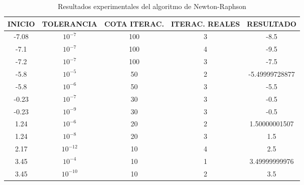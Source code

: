 \begin{table}
\end{table}
\begin{table}[H]
\begin{center}
\begin{tabular}{|c|c|c|c|c|}

   \hline
   \textbf{INICIO}  & \textbf{TOLERANCIA}  & \textbf{COTA ITERAC.} & \textbf{ITERAC. REALES} & \textbf{RESULTADO}  \\ \hline
   -7.08            & $10^{-7}$            & 100                   & 3                       & -8.5                \\ \hline
   -7.1             & $10^{-7}$            & 100                   & 4                       & -9.5                \\ \hline
   -7.2             & $10^{-7}$            & 100                   & 3                       & -7.5                \\ \hline
   -5.8             & $10^{-5}$            & 50                    & 2                       & -5.49999728877      \\ \hline
   -5.8             & $10^{-6}$            & 50                    & 3                       & -5.5                \\ \hline
   -0.23            & $10^{-7}$            & 30                    & 3                       & -0.5                \\ \hline
   -0.23            & $10^{-9}$            & 30                    & 3                       & -0.5                \\ \hline
   1.24             & $10^{-6}$            & 20                    & 2                       & 1.50000001507       \\ \hline
   1.24             & $10^{-8}$            & 20                    & 3                       & 1.5                 \\ \hline
   2.17             & $10^{-12}$           & 10                    & 4                       & 2.5                 \\ \hline
   3.45             & $10^{-4}$            & 10                    & 1                       & 3.49999999976       \\ \hline
   3.45             & $10^{-10}$           & 10                    & 2                       & 3.5                 \\ \hline
   
\end{tabular}
\end{center}
\caption{Resultados experimentales del algoritmo de Newton-Raphson}
\label{nwtable}
\end{table}
